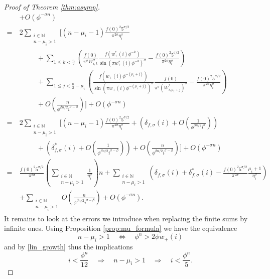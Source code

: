 \documentclass[10pt,a4paper]{amsart}
\newcommand{\bbN}{\mathbb{N}}
\begin{document}
\begin{proof}[Proof of Theorem \ref{thm:asymp}]
\begin{align*}
        & + O(\phi^{-\sigma n}) \\
        = ~& 2\sum_{\substack{i \in \bbN \\ n-\mu_i > 1}} \Bigg[ (n-\mu_i-1) \frac{f(0)^2 5^{\sigma/2}}{\pi^{2\sigma} \eta_i^\sigma} \\
        & ~~~~~~~~~~~ + \sum_{1 \leq k < \frac n2} \left(\frac{f(0)}{\pi^\sigma W_{i, k}^\sigma} \frac{f(w_+^*(i) \phi^{-k})}{{\sin(\pi w_+^*(i) \phi^{-k})}^\sigma} - \frac{f(0)^2 5^{\sigma/2}}{\pi^{2\sigma} \eta_i^\sigma}\right) \\
        & ~~~~~~~~~~~ + \sum_{1 \leq j < \frac n2 - \mu_i} \left(\frac{f(w_+(i) \phi^{-(\mu_i+j)})}{{\sin(\pi w_+(i) \phi^{-(\mu_i+j)})}^\sigma} \frac{f(0)}{\pi^\sigma (W_{i, \mu_i+j}^*)^\sigma} - \frac{f(0)^2 5^{\sigma/2}}{\pi^{2\sigma} \eta_i^\sigma}\right) \\
        & ~~~~~~~~~~~ + O\left(\frac{n}{\phi^{\beta n/2} i^{\sigma-\beta}}\right) \Bigg] + O(\phi^{-\sigma n}) \\
        = ~& 2\sum_{\substack{i \in \bbN \\ n-\mu_i > 1}} \Bigg[ (n-\mu_i-1) \frac{f(0)^2 5^{\sigma/2}}{\pi^{2\sigma} \eta_i^\sigma} + \left(\delta_{f, \sigma}(i) + O\left(\frac1{\phi^{\beta n/2} i^\sigma}\right)\right) \\
        & ~~~~~~~~~~~ + \left(\delta_{f, \sigma}^*(i) + O\left(\frac1{\phi^{\beta n/2} i^{\sigma-\beta}}\right)\right) + O\left(\frac{n}{\phi^{\beta n/2} i^{\sigma-\beta}}\right) \Bigg] + O(\phi^{-\sigma n}) \\
        = ~& \frac{f(0)^2 5^{\sigma/2}}{\pi^{2\sigma}} \left(\sum_{\substack{i \in \bbN \\ n-\mu_i > 1}} \frac1{\eta_i^\sigma}\right) n + \sum_{\substack{i \in \bbN \\ n-\mu_i > 1}} \left(\delta_{f, \sigma}(i) + \delta_{f, \sigma}^*(i) - \frac{f(0)^2 5^{\sigma/2}}{\pi^{2\sigma}} \frac{\mu_i+1}{\eta_i^\sigma}\right) \\
        & + \sum_{\substack{i \in \bbN \\ n-\mu_i > 1}}O\left(\frac{n}{\phi^{\beta n/2} i^{\sigma-\beta}}\right) + O(\phi^{-\sigma n}).
    \end{align*}
    It remains to look at the errors we introduce when replacing the finite sums by infinite ones. Using Proposition \ref{prop:mu_formula} we have the equivalence
    $$
    n - \mu_i > 1 \quad \Leftrightarrow \quad \phi^n > 2\phi w_+(i)
    $$
    and by \eqref{lin_growth} thus the implications
    $$
    i < \frac{\phi^n}{12} \quad \Rightarrow \quad n-\mu_i > 1 \quad \Rightarrow \quad i < \frac{\phi^n}{5}.
$$
\end{proof}
\end{document}
